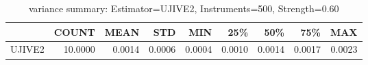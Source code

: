\begin{table}[ht]
\centering
\caption{variance summary: Estimator=UJIVE2, Instruments=500, Strength=0.60}
\begin{tabular}{lrrrrrrrr}
\toprule
 & COUNT & MEAN & STD & MIN & 25\% & 50\% & 75\% & MAX \\
\midrule
UJIVE2 & 10.0000 & 0.0014 & 0.0006 & 0.0004 & 0.0010 & 0.0014 & 0.0017 & 0.0023 \\
\bottomrule
\end{tabular}
\end{table}
